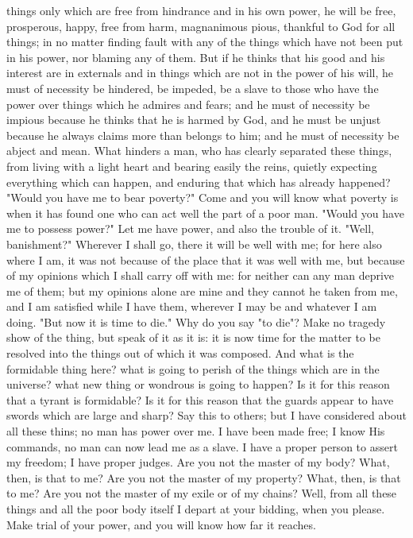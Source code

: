\documentclass[a4paper]{article}
\begin{document}
things only which are free from hindrance and in his own power, he will be
free, prosperous, happy, free from harm, magnanimous pious, thankful to God for
all things; in no matter finding fault with any of the things which have not
been put in his power, nor blaming any of them. But if he thinks that his good
and his interest are in externals and in things which are not in the power of
his will, he must of necessity be hindered, be impeded, be a slave to those who
have the power over things which he admires and fears; and he must of necessity
be impious because he thinks that he is harmed by God, and he must be unjust
because he always claims more than belongs to him; and he must of necessity be
abject and mean.
    What hinders a man, who has clearly separated these things, from living
with a light heart and bearing easily the reins, quietly expecting everything
which can happen, and enduring that which has already happened? "Would you have
me to bear poverty?" Come and you will know what poverty is when it has found
one who can act well the part of a poor man. "Would you have me to possess
power?" Let me have power, and also the trouble of it. "Well, banishment?"
Wherever I shall go, there it will be well with me; for here also where I am,
it was not because of the place that it was well with me, but because of my
opinions which I shall carry off with me: for neither can any man deprive me of
them; but my opinions alone are mine and they cannot he taken from me, and I am
satisfied while I have them, wherever I may be and whatever I am doing. "But
now it is time to die." Why do you say "to die"? Make no tragedy show of the
thing, but speak of it as it is: it is now time for the matter to be resolved
into the things out of which it was composed. And what is the formidable thing
here? what is going to perish of the things which are in the universe? what new
thing or wondrous is going to happen? Is it for this reason that a tyrant is
formidable? Is it for this reason that the guards appear to have swords which
are large and sharp? Say this to others; but I have considered about all these
thins; no man has power over me. I have been made free; I know His commands, no
man can now lead me as a slave. I have a proper person to assert my freedom; I
have proper judges. Are you not the master of my body? What, then, is that to
me? Are you not the master of my property? What, then, is that to me? Are you
not the master of my exile or of my chains? Well, from all these things and all
the poor body itself I depart at your bidding, when you please. Make trial of
your power, and you will know how far it reaches.
\end{document}
